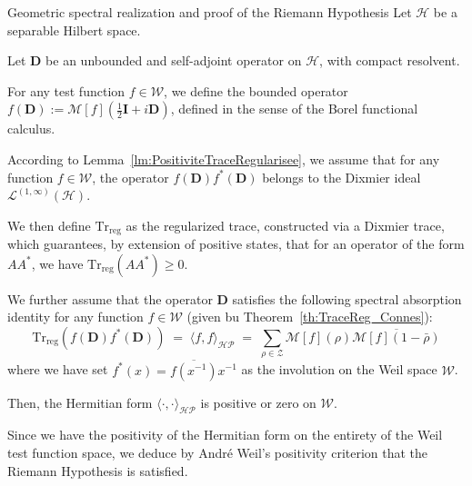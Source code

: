 \documentclass[Riemann_Hypothesis.tex]{subfiles}
\begin{document}
\begin{theoremEn}[label=th:ResolutionConjectureHP]{Geometric spectral realization and proof of the Riemann Hypothesis}
    Let $\mathcal{H}$ be a separable Hilbert space. \par
    Let $\mathbf{D}$ be an unbounded and self-adjoint operator on $\mathcal{H}$, with compact resolvent. \par
    For any test function $f \in \mathcal{W}$, we define the bounded 
    operator $f(\mathbf{D}) := \mathcal{M}[f]\left(\frac{1}{2}\mathbf{I} + i\mathbf{D}\right)$, 
    defined in the sense of the Borel functional calculus. \par
    According to Lemma~\ref{lm:PositiviteTraceRegularisee}, 
    we assume that for any function $f \in \mathcal{W}$, 
    the operator $f(\mathbf{D}) f^*(\mathbf{D})$ belongs to the 
    Dixmier ideal $\mathcal{L}^{(1, \infty)}(\mathcal{H})$. \par
    We then define $\mathrm{Tr}_{\mathrm{reg}}$ as the regularized trace, 
    constructed via a Dixmier trace, which guarantees, by extension 
    of positive states, that for an operator of the form $A A^*$, we have 
    $\mathrm{Tr}_{\mathrm{reg}}(A A^*) \geq 0$. \par
    We further assume that the operator $\mathbf{D}$ satisfies the following spectral absorption 
    identity for any function $f \in \mathcal{W}$ (given bu Theorem~\ref{th:TraceReg_Connes}):
    \begin{equation*}
        \mathrm{Tr}_{\mathrm{reg}}\left( f(\mathbf{D}) f^*(\mathbf{D}) \right) \;=\; \langle f, f \rangle_{\mathcal{HP}} \;=\; \sum_{\rho \in \mathcal{Z}} \mathcal{M}[f](\rho) \overline{\mathcal{M}[f](1-\bar{\rho})}
    \end{equation*}
    where we have set $f^*(x) = \overline{f(x^{-1})} x^{-1}$ as the involution on the Weil space 
    $\mathcal{W}$. \par
    Then, the Hermitian form $\langle \cdot, \cdot \rangle_{\mathcal{HP}}$ is positive or zero 
    on $\mathcal{W}$. \par
    Since we have the positivity of the Hermitian form on the entirety of the Weil test function 
    space, we deduce by André Weil's positivity criterion that the Riemann Hypothesis is satisfied.
\end{theoremEn}
\end{document}
